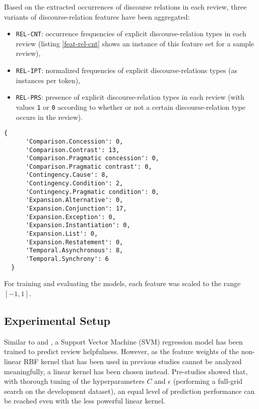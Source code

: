\documentclass[
    a4paper,%
    12pt,%
    oneside,%
    toc=bibliography,
    final,
]{scrartcl}
\begin{document}
Based on the extracted occurrences of discourse relations in each review, three variants of discourse-relation features have been aggregated:

\begin{itemize}
\item \lstinline|REL-CNT|: occurrence frequencies of explicit discourse-relation types in each review (listing \ref{feat-rel-cnt} shows an instance of this feature set for a sample review),
\item \lstinline|REL-IPT|: normalized frequencies of explicit discourse-relations types (as instances per token),
\item \lstinline|REL-PRS|: presence of explicit discourse-relation types in each review (with values \lstinline|1| or \lstinline|0| according to whether or not a certain discourse-relation type occurs in the review).
\end{itemize}

\begin{lstlisting}[caption=\texttt{REL-CNT} feature for a sample review., label=feat-rel-cnt, basicstyle=\ttfamily\small\singlespacing]
  {
      'Comparison.Concession': 0,
      'Comparison.Contrast': 13,
      'Comparison.Pragmatic concession': 0,
      'Comparison.Pragmatic contrast': 0,
      'Contingency.Cause': 8,
      'Contingency.Condition': 2,
      'Contingency.Pragmatic condition': 0,
      'Expansion.Alternative': 0,
      'Expansion.Conjunction': 17,
      'Expansion.Exception': 0,
      'Expansion.Instantiation': 0,
      'Expansion.List': 0,
      'Expansion.Restatement': 0,
      'Temporal.Asynchronous': 8,
      'Temporal.Synchrony': 6
  }
\end{lstlisting}

For training and evaluating the models, each feature was scaled to the range $ [-1, 1] $.


\subsection{Experimental Setup}

Similar to \citet{Kim2006} and \citet{Golly2017}, a Support Vector Machine (SVM) regression model has been trained to predict review helpfulness. However, as the feature weights of the non-linear RBF kernel that has been used in previous studies cannot be analyzed meaningfully, a linear kernel has been chosen instead. Pre-studies showed that, with thorough tuning of the hyperparameters $ C $ and $ \epsilon $ (performing a full-grid search on the development dataset), an equal level of prediction performance can be reached even with the less powerful linear kernel.
\end{document}
